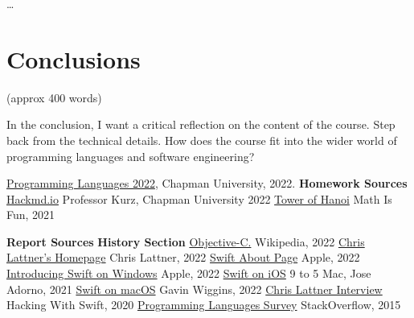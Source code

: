 \documentclass{article}
\theoremstyle{theorem}
\theoremstyle{definition}
\theoremstyle{remark}
\begin{document}
\ldots

\section{Conclusions}\label{conclusions}

(approx 400 words)

In the conclusion, I want a critical reflection on the content of the course. Step back from the technical details. How does the course fit into the wider world of programming languages and software engineering?

\begin{thebibliography}{99}

 \href{https://github.com/alexhkurz/programming-languages-2022/blob/main/README.md}{Programming Languages 2022}, Chapman University, 2022.\newline
\newline
\textbf{Homework Sources} \newline
\href{https://hackmd.io/@alexhkurz/H1jUka4Gv#fn2}{Hackmd.io} Professor Kurz, Chapman University 2022\newline\newline
\href{https://www.mathsisfun.com/games/towerofhanoi.html}{Tower of Hanoi} Math Is Fun, 2021 \newline

\textbf{Report Sources}\newline
\textbf{History Section}\newline
\href{https://en.wikipedia.org/wiki/Objective-C#:~:text=10%20External%20links-,History,Programming%20Technology%20Center%20in%201981.}{Objective-C.} Wikipedia, 2022\newline
\href{https://nondot.org/~sabre/}{Chris Lattner's Homepage} Chris Lattner, 2022\newline
\href{https://www.swift.org/about/}{Swift About Page} Apple, 2022\newline
\href{https://www.swift.org/blog/swift-on-windows/}{Introducing Swift on Windows} Apple, 2022\newline
\href{https://9to5mac.com/2021/12/15/apple-releases-long-awaited-swift-playgrounds-update-with-the-ability-to-create-apps-using-ipad/}{Swift on iOS} 9 to 5 Mac, Jose Adorno, 2021 \newline
\href{https://gavinw.me/swift-macos/}{Swift on macOS} Gavin Wiggins, 2022 \newline
\href{https://www.hackingwithswift.com/interviews/chris-lattner-how-did-you-start-creating-swift}{Chris Lattner Interview} Hacking With Swift, 2020\newline
\href{https://stackoverflow.blog/2015/04/07/stack-overflow-developer-survey-2015-the-results/}{Programming Languages Survey} StackOverflow, 2015\newline


\end{thebibliography}
\end{document}
